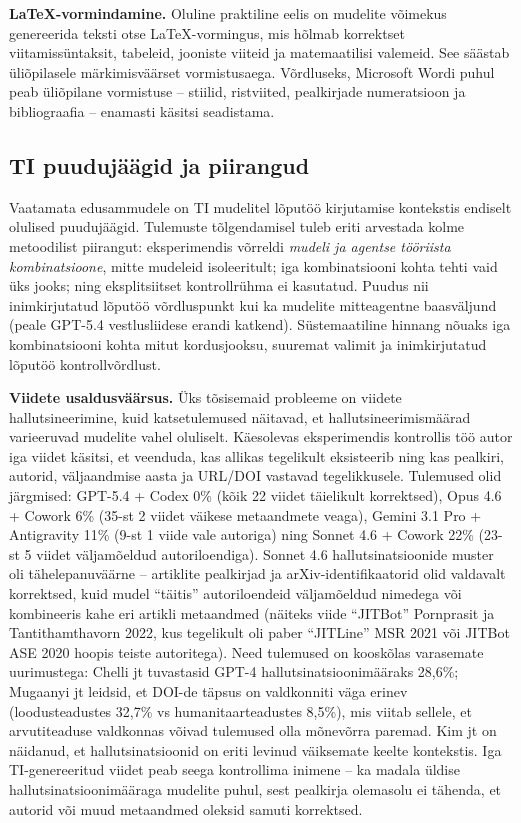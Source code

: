 \textbf{\LaTeX{}-vormindamine.} Oluline praktiline eelis on mudelite võimekus genereerida teksti otse \LaTeX{}-vormingus, mis hõlmab korrektset viitamissüntaksit, tabeleid, jooniste viiteid ja matemaatilisi valemeid. See säästab üliõpilasele märkimisväärset vormistusaega. Võrdluseks, Microsoft Wordi puhul peab üliõpilane vormistuse -- stiilid, ristviited, pealkirjade numeratsioon ja bibliograafia -- enamasti käsitsi seadistama.

\subsection{TI puudujäägid ja piirangud} \label{subsec:puudujaagid}

Vaatamata edusammudele on TI mudelitel lõputöö kirjutamise kontekstis endiselt olulised puudujäägid. Tulemuste tõlgendamisel tuleb eriti arvestada kolme metoodilist piirangut: eksperimendis võrreldi \emph{mudeli ja agentse tööriista kombinatsioone}, mitte mudeleid isoleeritult; iga kombinatsiooni kohta tehti vaid üks jooks; ning eksplitsiitset kontrollrühma ei kasutatud. Puudus nii inimkirjutatud lõputöö võrdluspunkt kui ka mudelite mitteagentne baasväljund (peale GPT-5.4 vestlusliidese erandi katkend). Süstemaatiline hinnang nõuaks iga kombinatsiooni kohta mitut kordusjooksu, suuremat valimit ja inimkirjutatud lõputöö kontrollvõrdlust.

\textbf{Viidete usaldusväärsus.} Üks tõsisemaid probleeme on viidete hallutsineerimine, kuid katsetulemused näitavad, et hallutsineerimismäärad varieeruvad mudelite vahel oluliselt. Käesolevas eksperimendis kontrollis töö autor iga viidet käsitsi, et veenduda, kas allikas tegelikult eksisteerib ning kas pealkiri, autorid, väljaandmise aasta ja URL/DOI vastavad tegelikkusele. Tulemused olid järgmised: GPT-5.4 + Codex 0\% (kõik 22 viidet täielikult korrektsed), Opus 4.6 + Cowork 6\% (35-st 2 viidet väikese metaandmete veaga), Gemini 3.1 Pro + Antigravity 11\% (9-st 1 viide vale autoriga) ning Sonnet 4.6 + Cowork 22\% (23-st 5 viidet väljamõeldud autoriloendiga). Sonnet 4.6 hallutsinatsioonide muster oli tähelepanuväärne -- artiklite pealkirjad ja arXiv-identifikaatorid olid valdavalt korrektsed, kuid mudel ``täitis'' autoriloendeid väljamõeldud nimedega või kombineeris kahe eri artikli metaandmed (näiteks viide ``JITBot'' Pornprasit ja Tantithamthavorn 2022, kus tegelikult oli paber ``JITLine'' MSR 2021 või JITBot ASE 2020 hoopis teiste autoritega). Need tulemused on kooskõlas varasemate uurimustega: Chelli jt \cite{chelli2024hallucination} tuvastasid GPT-4 hallutsinatsioonimääraks 28,6\%; Mugaanyi jt \cite{mugaanyi2024citation} leidsid, et DOI-de täpsus on valdkonniti väga erinev (loodusteadustes 32,7\% vs humanitaarteadustes 8,5\%), mis viitab sellele, et arvutiteaduse valdkonnas võivad tulemused olla mõnevõrra paremad. Kim jt \cite{kim2025geographic} on näidanud, et hallutsinatsioonid on eriti levinud väiksemate keelte kontekstis. Iga TI-genereeritud viidet peab seega kontrollima inimene -- ka madala üldise hallutsinatsioonimääraga mudelite puhul, sest pealkirja olemasolu ei tähenda, et autorid või muud metaandmed oleksid samuti korrektsed.

